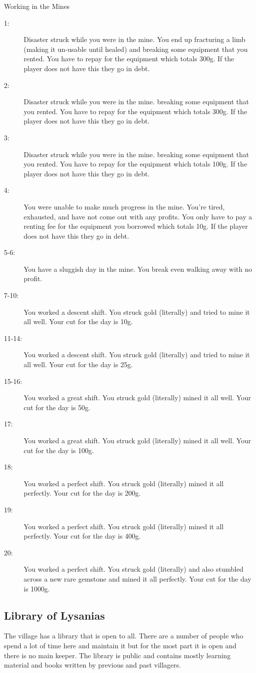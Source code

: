 \begin{commentbox}{Working in the Mines}
	\begin{description}
		\item[1:] Disaster struck while you were in the mine. You end up fracturing a limb (making it un-usable until healed) and breaking some equipment that you rented. You have to repay for the equipment which totals 300g. If the player does not have this they go in debt.
		\item[2:] Disaster struck while you were in the mine. breaking some equipment that you rented. You have to repay for the equipment which totals 300g. If the player does not have this they go in debt.
		\item[3:] Disaster struck while you were in the mine. breaking some equipment that you rented. You have to repay for the equipment which totals 100g. If the player does not have this they go in debt.
		\item[4:] You were unable to make much progress in the mine. You're tired, exhausted, and have not come out with any profits. You only have to pay a renting fee for the equipment you borrowed which totals 10g. If the player does not have this they go in debt.
		\item[5-6:] You have a sluggish day in the mine. You break even walking away with no profit.
		\item[7-10:] You worked a descent shift. You struck gold (literally) and tried to mine it all well. Your cut for the day is 10g.
		\item[11-14:] You worked a descent shift. You struck gold (literally) and tried to mine it all well. Your cut for the day is 25g.
		\item[15-16:] You worked a great shift. You struck gold (literally) mined it all well. Your cut for the day is 50g.
		\item[17:] You worked a great shift. You struck gold (literally) mined it all well. Your cut for the day is 100g.
		\item[18:] You worked a perfect shift. You struck gold (literally) mined it all perfectly. Your cut for the day is 200g.
		\item[19:] You worked a perfect shift. You struck gold (literally) mined it all perfectly. Your cut for the day is 400g.
		\item[20:] You worked a perfect shift. You struck gold (literally) and also stumbled across a new rare gemstone and mined it all perfectly. Your cut for the day is 1000g.
	\end{description}
\end{commentbox}

\subsection{Library of Lysanias}

The village has a library that is open to all. There are a number of people who spend a lot of time here and maintain it but for the most part it is open and there is no main keeper. The library is public and contains mostly learning material and books written by previous and past villagers.